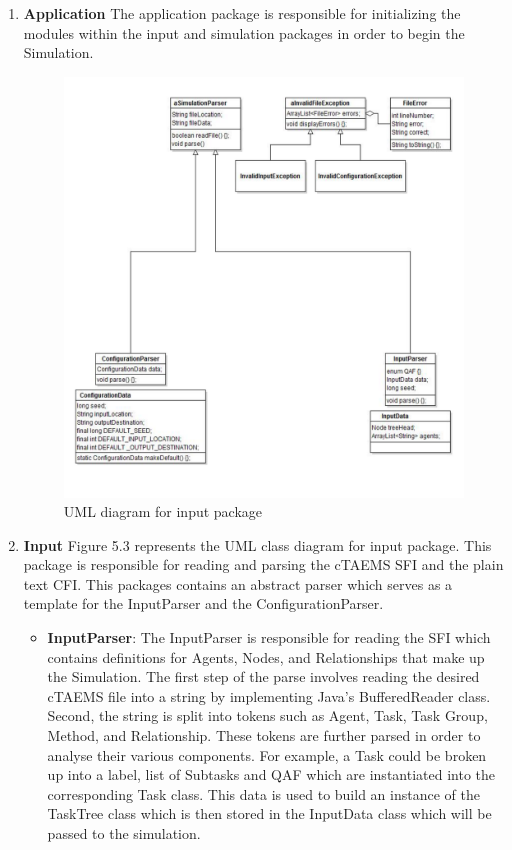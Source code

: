 \begin{enumerate}

\item \textbf{Application}  The application package is responsible for initializing the modules within the input and simulation packages in order to begin the Simulation.

\begin{figure}[H]
\centering
\includegraphics[width=5.0in]{figs/inputUML}
\caption{UML diagram for input package}
\label{fig:input}
\end{figure}

\item \textbf{Input} Figure 5.3 represents the UML class diagram for input package. This package is responsible for reading and parsing the cTAEMS SFI and the plain text CFI. This packages contains an abstract parser which serves as a template for the InputParser and the ConfigurationParser. \\

\begin{itemize}
\item \textbf{InputParser}: The InputParser is responsible for reading the SFI which contains definitions for Agents, Nodes, and Relationships that make up the Simulation. The first step of the parse involves reading the desired cTAEMS file into a string by implementing Java's BufferedReader class. Second, the string is split into tokens such as Agent, Task, Task Group, Method, and Relationship. These tokens are further parsed in order to analyse their various components. For example, a Task could be broken up into a label, list of Subtasks and QAF which are instantiated into the corresponding Task class. This data is used to build an instance of the TaskTree class which is then stored in the InputData class which will be passed to the simulation. \\


\end{itemize}
\end{enumerate}
